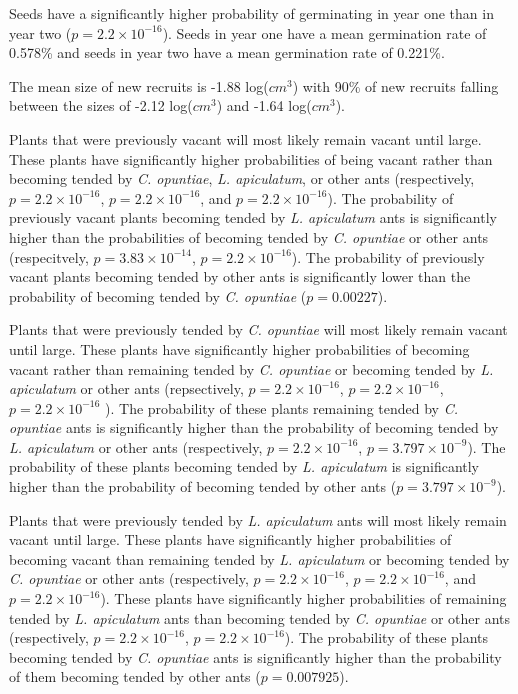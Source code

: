 \documentclass[11pt]{article}
\begin{document}
{{%
Seeds have a significantly higher probability of germinating in year one than in year two ($p = 2.2 \times 10^{-16}$).
Seeds in year one have a mean germination rate of 0.578\% and seeds in year two have a mean germination rate of 0.221\%. 

 The mean size of new recruits is -1.88 log($cm^3$) with 90\% of new recruits falling between the sizes of -2.12 log($cm^3$) and -1.64 log($cm^3$).
 
Plants that were previously vacant will most likely remain vacant until large. 
These plants have significantly higher probabilities of being vacant rather than becoming tended  by \textit{C. opuntiae}, \textit{L. apiculatum}, or other ants (respectively, $p = 2.2 \times 10^{-16}$, $p = 2.2 \times 10^{-16}$, and $p = 2.2 \times 10^{-16}$).
The probability of previously vacant plants becoming tended by \textit{L. apiculatum} ants is significantly higher than the probabilities of becoming tended by \textit{C. opuntiae} or other ants (respecitvely, $p = 3.83 \times 10^{-14}$, $p = 2.2 \times 10^{-16}$).
The probability of previously vacant plants becoming tended by other ants is significantly lower than the probability of becoming tended by \textit{C. opuntiae} ($p = 0.00227$).

Plants that were previously tended by \textit{C. opuntiae} will most likely remain vacant until large. 
These plants have significantly higher probabilities of becoming vacant rather than remaining tended by \textit{C. opuntiae} or becoming tended by \textit{L. apiculatum} or other ants (repsectively, $p = 2.2 \times 10^{-16}$, $p = 2.2 \times 10^{-16}$, $p = 2.2 \times 10^{-16}$ ).
The probability of these plants remaining tended by \textit{C. opuntiae} ants is significantly higher than the probability of becoming tended by \textit{L. apiculatum} or other ants (respectively, $p = 2.2 \times 10^{-16}$, $p = 3.797 \times 10^{-9}$).
The probability of these plants becoming tended by \textit{L. apiculatum} is significantly higher than the probability of becoming tended by other ants ($p = 3.797 \times 10^{-9}$).

Plants that were previously tended by \textit{L. apiculatum} ants will most likely remain vacant until large. 
These plants have significantly higher probabilities of becoming vacant than remaining tended by \textit{L. apiculatum} or becoming tended by \textit{C. opuntiae} or other ants (respectively, $p = 2.2 \times 10^{-16}$, $p = 2.2 \times 10^{-16}$, and $p = 2.2 \times 10^{-16}$).
These plants have significantly higher probabilities of remaining tended by \textit{L. apiculatum} ants than becoming tended by  \textit{C. opuntiae} or other ants (respectively, $p = 2.2 \times 10^{-16}$, $p = 2.2 \times 10^{-16}$).
The probability of these plants becoming tended by \textit{C. opuntiae} ants is significantly higher than the probability of them becoming tended by other ants ($p = 0.007925$).

}}
\end{document}
